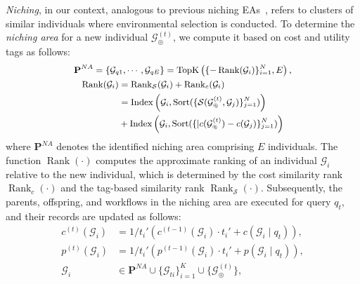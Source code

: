 \documentclass{article}
\theoremstyle{plain}
\theoremstyle{definition}
\theoremstyle{remark}
\begin{document}
\textit{Niching}, in our context, analogous to previous niching EAs~\citep{white2023nas1000}, refers to clusters of similar individuals where environmental selection is conducted. To determine the \textit{niching area} for a new individual \({\mathcal{G}_\circledcirc^{(t)}}\), we compute it based on cost and utility tags as follows:
\begin{equation}
\small
\label{eq:define-niching}
\begin{gathered}
\mathbf{P}^{NA}=\{\mathcal{G}_{q1}, \cdots, \mathcal{G}_{qE}\} = \operatorname{TopK}\left(\{-\operatorname{Rank}(\mathcal{G}_i)\}_{i=1}^N, E\right),\\
\begin{aligned}
  \operatorname{Rank}(\mathcal{G}_i) 
  &= \operatorname{Rank}_{\mathcal{S}}(\mathcal{G}_i) + \operatorname{Rank}_{c}(\mathcal{G}_i)\\
  &= \text{Index}\left(\mathcal{G}_i, \text{Sort}(\{\mathcal{S}({\mathcal{G}_\circledcirc^{(t)}}, \mathcal{G}_j)\}_{j=1}^N)\right) \\
    &+\text{Index}\left(\mathcal{G}_i, \text{Sort}(\{|c({\mathcal{G}_\circledcirc^{(t)}}) - c(\mathcal{G}_j)\}_{j=1}^N)\right) \\
    \end{aligned}
\end{gathered}
\end{equation}
where \(\mathbf{P}^{NA}\) denotes the identified niching area comprising \(E\) individuals. The function \(\operatorname{Rank}(\cdot)\) computes the approximate ranking of an individual \(\mathcal{G}_i\) relative to the new individual, which is determined by the cost similarity rank \(\operatorname{Rank}_c(\cdot)\) and the tag-based similarity rank \(\operatorname{Rank}_\mathcal{S}(\cdot)\). Subsequently, the parents, offspring, and workflows in the niching area are executed for query \(q_t\), and their records are updated as follows:
\begin{equation}
\begin{aligned}
c^{(t)}(\mathcal{G}_i) &= {1}/{t_i'}\left(c^{(t-1)}(\mathcal{G}_i) \cdot t_i' + c(\mathcal{G}_i \mid q_t)\right), \\
p^{(t)}(\mathcal{G}_i) &= {1}/{t_i'}\left(p^{(t-1)}(\mathcal{G}_i) \cdot t_i' + p(\mathcal{G}_i \mid q_t)\right),\\
\mathcal{G}_i &\in \mathbf{P}^{NA}\cup \{\mathcal{G}_{ti}\}_{i=1}^K \cup \{{\mathcal{G}_\circledcirc^{(t)}}\},
\end{aligned}
\end{equation}
\end{document}
